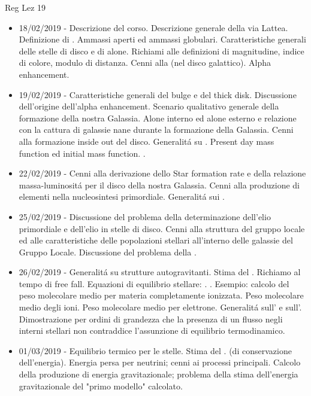 \begin{frame}[allowframebreaks]{Reg Lez 19}
%
\begin{itemize}
\item 18/02/2019 - Descrizione del corso. Descrizione generale della via Lattea. Definizione di . Ammassi aperti ed ammassi globulari. Caratteristiche generali delle stelle di disco e di alone. Richiami alle definizioni di magnitudine, indice di colore, modulo di distanza. Cenni alla  (nel disco galattico). Alpha enhancement.  
\item 19/02/2019 - Caratteristiche generali del bulge e del thick disk. Discussione dell'origine dell'alpha enhancement. Scenario qualitativo generale della formazione della nostra Galassia. Alone interno ed alone esterno e relazione con la cattura di galassie nane durante la formazione della Galassia. Cenni alla formazione inside out del disco. Generalit\'a su . Present day mass function ed initial mass function. . 
\item 22/02/2019 - Cenni alla derivazione dello Star formation rate e della relazione massa-luminosit\'a per il disco della nostra Galassia. Cenni alla produzione di elementi nella nucleosintesi primordiale. Generalit\'a sui . 
\item 25/02/2019 - Discussione del problema della determinazione dell'elio primordiale e dell'elio in stelle di disco. Cenni alla struttura del gruppo locale ed alle caratteristiche delle popolazioni stellari all'interno delle galassie del Gruppo Locale. Discussione del problema della . 
\item 26/02/2019 - Generalit\'a su strutture autogravitanti. Stima del . Richiamo al tempo di free fall. Equazioni di equilibrio stellare: . . Esempio: calcolo del peso molecolare medio per materia completamente ionizzata. Peso molecolare medio degli ioni. Peso molecolare medio per elettrone. Generalit\'a sull' e sull'. Dimostrazione per ordini di grandezza che la presenza di un flusso negli interni stellari non contraddice l'assunzione di equilibrio termodinamico. 
\item 01/03/2019 - Equilibrio termico per le stelle. Stima del .  (di conservazione dell'energia). Energia persa per neutrini; cenni ai processi principali. Calcolo della produzione di energia gravitazionale; problema della stima dell'energia gravitazionale del "primo modello" calcolato.


\end{itemize}
\end{frame}
